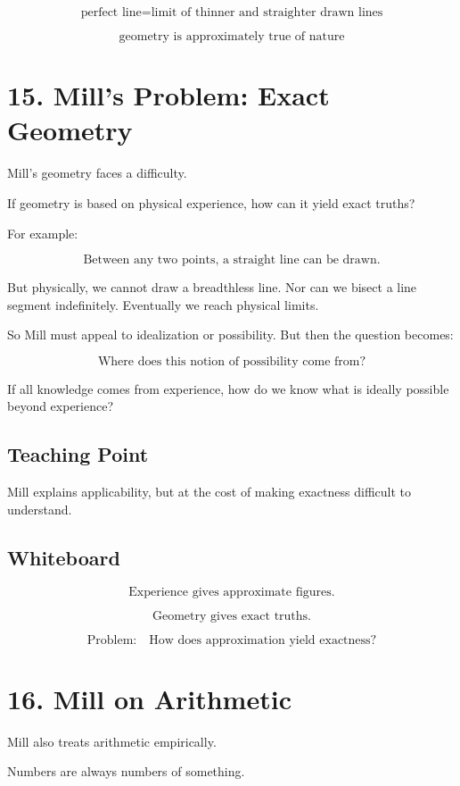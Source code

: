 \documentclass[11pt]{article}
\begin{document}
\[
\text{perfect line} = \text{limit of thinner and straighter drawn lines}
\]

\[
\text{geometry is approximately true of nature}
\]

\section*{15. Mill's Problem: Exact Geometry}

Mill's geometry faces a difficulty.

If geometry is based on physical experience, how can it yield exact truths?

For example:

\[
\text{Between any two points, a straight line can be drawn.}
\]

But physically, we cannot draw a breadthless line. Nor can we bisect a line segment
indefinitely. Eventually we reach physical limits.

So Mill must appeal to idealization or possibility. But then the question becomes:

\[
\boxed{
\text{Where does this notion of possibility come from?}
}
\]

If all knowledge comes from experience, how do we know what is ideally possible beyond
experience?

\subsection*{Teaching Point}

Mill explains applicability, but at the cost of making exactness difficult to understand.

\subsection*{Whiteboard}

\[
\text{Experience gives approximate figures.}
\]

\[
\text{Geometry gives exact truths.}
\]

\[
\text{Problem:}
\quad
\text{How does approximation yield exactness?}
\]

\section*{16. Mill on Arithmetic}

Mill also treats arithmetic empirically.

Numbers are always numbers of something.
\end{document}
